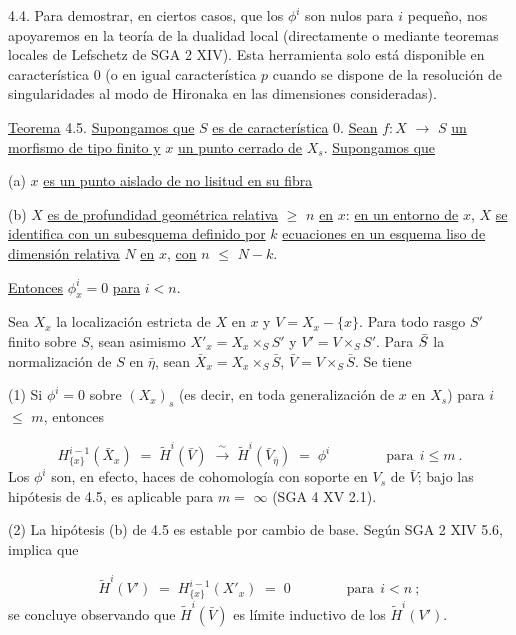 4.4.  Para demostrar, en ciertos casos, que los $\phi^i$ son nulos para $i$ pequeño, nos apoyaremos en la teoría de la dualidad local (directamente o mediante teoremas locales de Lefschetz de SGA 2 XIV). Esta herramienta solo está disponible en característica 0 (o en igual característica $p$ cuando se dispone de la resolución de singularidades al modo de Hironaka en las dimensiones consideradas).



\underline{Teorema} 4.5.  \underline{Supongamos que} $S$ \underline{es de característica} 0. \underline{Sean} $f : X$ $\longrightarrow$ $S$ \underline{un morfismo de tipo finito y} $x$ \underline{un punto cerrado de} $X_s$. \underline{Supongamos que}

(a) $x$ \underline{es un punto aislado de no lisitud en su fibra}

(b) $X$ \underline{es de profundidad geométrica relativa} $\geqslant$ $n$ \underline{en} $x$: \underline{en un entorno de} $x$, $X$ \underline{se identifica con un subesquema definido por} $k$ \underline{ecuaciones en un esquema liso de dimensión relativa} $N$ \underline{en} $x$, \underline{con} $n$ $\leqslant$ $N-k$.

\underline{Entonces} $\phi^i_x = 0$ \underline{para} $i < n$.

Sea $X_x$ la localización estricta de $X$ en $x$ y $V = X_x - \{x\}$. Para todo rasgo $S'$ finito sobre $S$, sean asimismo $X'_x = X_x \times_S S'$ y $V' = V \times_S S'$. Para $\sisi{S}{\bar{S}}$ la normalización de $S$ en $\bar{\eta}$, sean $\bar{X}_x = X_x \times_S \bar{S}$, $\bar{V} = V \times_S \bar{S}$. Se tiene

(1) Si $\phi^i = 0$ sobre $(X_x)_s$ (es decir, en toda generalización de $x$ en $X_s$) para $i$ $\leqslant$ $m$, entonces

\begin{equation*}
H^{i-1}_{\{x\}}(\bar{X}_x) \;=\; \widetilde{H}^{i}(\bar{V}) \;\xrightarrow{\ \sim\ }\; \widetilde{H}^{i}(\bar{V}_{\bar{\eta}}) \;=\; \phi^i \qquad\qquad \text{para}\ \ i \leqslant m\ .
\end{equation*}
Los $\phi^i$ son, en efecto, haces de cohomología con soporte en $V_s$ de $\bar{V}$; bajo las hipótesis de 4.5,  es aplicable para $m =$ $\infty$ (SGA 4 XV 2.1).

(2) La hipótesis (b) de 4.5 es estable por cambio de base. Según SGA 2 XIV 5.6, implica que

\begin{equation*}
\widetilde{H}^{i}(V') \;=\; H^{i-1}_{\{x\}}(X'_x) \;=\; 0 \qquad\qquad \text{para}\ \ i < n\ ;
\end{equation*}
se concluye observando que $\widetilde{H}^{i}(\bar{V})$ es límite inductivo de los $\widetilde{H}^{i}(V')$.

